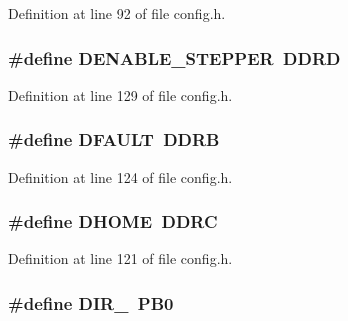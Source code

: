 Definition at line 92 of file config.\-h.

\hypertarget{group__biba__config_ga11a7f88811704d85bf9e6e88e5b4a13a}{
\subsubsection[{D\-E\-N\-A\-B\-L\-E\-\_\-\-S\-T\-E\-P\-P\-E\-R}]{\setlength{\rightskip}{0pt plus 5cm}\#define D\-E\-N\-A\-B\-L\-E\-\_\-\-S\-T\-E\-P\-P\-E\-R~D\-D\-R\-D}}\label{group__biba__config_ga11a7f88811704d85bf9e6e88e5b4a13a}


Definition at line 129 of file config.\-h.

\hypertarget{group__biba__config_ga6b14a46014e8d8efa630e7df0f08b368}{
\subsubsection[{D\-F\-A\-U\-L\-T}]{\setlength{\rightskip}{0pt plus 5cm}\#define D\-F\-A\-U\-L\-T~D\-D\-R\-B}}\label{group__biba__config_ga6b14a46014e8d8efa630e7df0f08b368}


Definition at line 124 of file config.\-h.

\hypertarget{group__biba__config_ga80ca054824bc462b54a3fcfdf7f6be87}{
\subsubsection[{D\-H\-O\-M\-E}]{\setlength{\rightskip}{0pt plus 5cm}\#define D\-H\-O\-M\-E~D\-D\-R\-C}}\label{group__biba__config_ga80ca054824bc462b54a3fcfdf7f6be87}


Definition at line 121 of file config.\-h.

\hypertarget{group__biba__config_ga251b49d43197436ec9943946734a7945}{
\subsubsection[{D\-I\-R\-\_\-485}]{\setlength{\rightskip}{0pt plus 5cm}\#define D\-I\-R\-\_~P\-B0}}\label{group__biba__config_ga251b49d43197436ec9943946734a7945}



